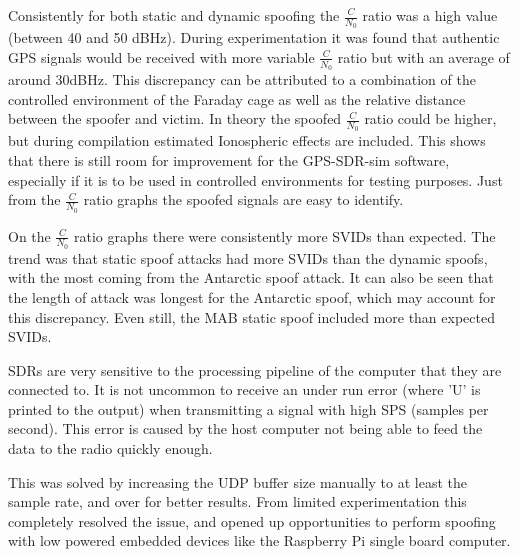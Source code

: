 Consistently for both static and dynamic spoofing the $\frac{C}{N_0}$ ratio was a high value (between 40 and 50 dBHz). During experimentation it was found that authentic
GPS signals would be received with more variable $\frac{C}{N_0}$ ratio but with an average of around 30dBHz. This discrepancy can be attributed to a combination of the
controlled environment of the Faraday cage as well as the relative distance between the spoofer and victim. In theory the spoofed $\frac{C}{N_0}$ ratio could be higher,
but during compilation estimated Ionospheric effects are included. This shows that there is still room for improvement for the GPS-SDR-sim software, especially if it is
to be used in controlled environments for testing purposes. Just from the $\frac{C}{N_0}$ ratio graphs the spoofed signals are easy to identify.

On the $\frac{C}{N_0}$ ratio graphs there were consistently more SVIDs than expected. The trend was that static spoof attacks had more SVIDs than the dynamic spoofs, with
the most coming from the Antarctic spoof attack. It can also be seen that the length of attack was longest for the Antarctic spoof, which may account for this
discrepancy. Even still, the MAB static spoof included more than expected SVIDs.

SDRs are very sensitive to the processing pipeline of the computer that they are connected to. It is not uncommon to receive an under run error (where 'U' is printed to the
output) when transmitting a signal with high SPS (samples per second). This error is caused by the host computer not being able to feed the data to the radio quickly
enough.

This was solved by increasing the UDP buffer size manually to at least the sample rate, and over for better results. From limited experimentation this completely resolved the issue, and opened up
opportunities to perform spoofing with low powered embedded devices like the Raspberry Pi single board computer.
